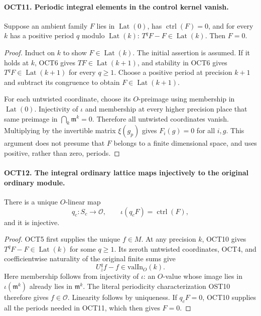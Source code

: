 \paragraph{OCT11. Periodic integral elements in the control kernel vanish.}
\label{claim:OCT11}
Suppose an ambient family $F$ lies in $\operatorname{Lat}(0)$,
has $\operatorname{ctrl}(F)=0$, and for every $k$ has a
positive period $q$ modulo $\operatorname{Lat}(k)$:
$T^qF-F\in\operatorname{Lat}(k)$.  Then $F=0$.
\begin{proof}
Induct on $k$ to show $F\in\operatorname{Lat}(k)$.  The
initial assertion is assumed.  If it holds at $k$, OCT6 gives
$TF\in\operatorname{Lat}(k+1)$, and stability in OCT6 gives
$T^qF\in\operatorname{Lat}(k+1)$ for every $q\geq1$.
Choose a positive period at precision $k+1$ and subtract its
congruence to obtain $F\in\operatorname{Lat}(k+1)$.

For each untwisted coordinate, choose its $O$-preimage using
membership in $\operatorname{Lat}(0)$.  Injectivity of
$\iota$ and membership at every higher precision place that
same preimage in $\bigcap_k\mathfrak m^k=0$.  Therefore all
untwisted coordinates vanish.  Multiplying by the invertible
matrix $\xi(g_p)$ gives $F_i(g)=0$ for all $i,g$.
This argument does not presume that $F$ belongs to a finite
dimensional space, and uses positive, rather than zero,
periods.
\end{proof}

\paragraph{OCT12. The integral ordinary lattice maps injectively to the original ordinary module.}
\label{claim:OCT12}
There is a unique $O$-linear map
\[
             q_c:S_c\longrightarrow\mathcal O,
                  \qquad \iota(q_cF)=\operatorname{ctrl}(F),
\]
and it is injective.
\begin{proof}
OCT5 first supplies the unique $f\in M$.  At any precision
$k$, OCT10 gives $T^qF-F\in\operatorname{Lat}(k)$ for some
$q\geq1$.  Its zeroth untwisted coordinates, OCT4, and
coefficientwise naturality of the original finite sums give
\[
                     U_z^q f-f\in\mathrm{valIn}_O(k).
\]
Here membership follows from injectivity of $\iota$:
an $O$-value whose image lies in $\iota(\mathfrak m^k)$
already lies in $\mathfrak m^k$.  The literal periodicity
characterization OST10 therefore gives $f\in\mathcal O$.
Linearity follows by uniqueness.  If $q_cF=0$, OCT10 supplies
all the periods needed in OCT11, which then gives $F=0$.
\end{proof}

